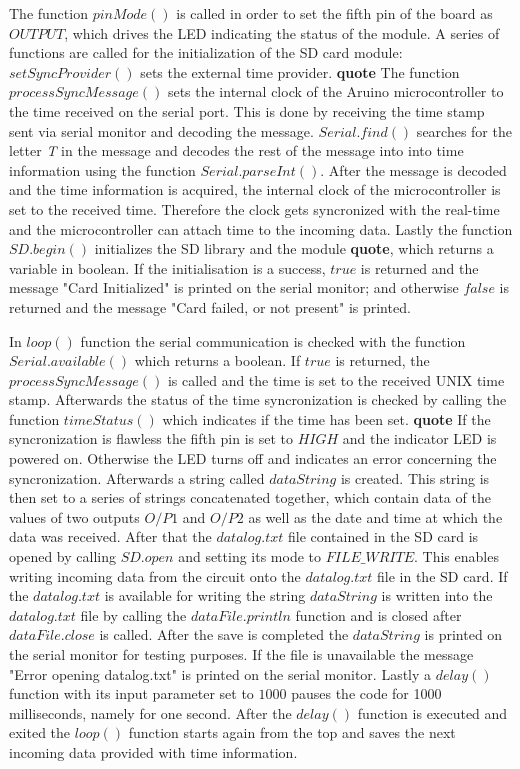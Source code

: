 The function $pinMode()$ is called in order to set the fifth pin of the board as $OUTPUT$, which drives the LED indicating the status of the module. A series of functions are called for the initialization of the SD card module: $setSyncProvider()$ sets the external time provider. \textbf{quote} The function $processSyncMessage()$ sets the internal clock of the Aruino microcontroller to the time received on the serial port. This is done by receiving the time stamp sent via serial monitor and decoding the message. $Serial.find()$ searches for the letter \textit{T} in the message and decodes the rest of the message into  into time information using the function $Serial.parseInt()$. After the message is decoded and the time information is acquired, the internal clock of the microcontroller is set to the received time. Therefore the clock gets syncronized with the real-time and the microcontroller can attach time to the incoming data. Lastly the function $SD.begin()$ initializes the SD library and the module \textbf{quote}, which returns a variable in boolean. If the initialisation is a success, $true$ is returned and the message "Card Initialized" is printed on the serial monitor; and otherwise $false$ is returned and the message "Card failed, or not present" is printed. \par 
In $loop()$ function the serial communication is checked with the function $Serial.available()$ which returns a boolean. If $true$ is returned, the $processSyncMessage()$ is called and the time is set to the received UNIX time stamp. Afterwards the status of the time syncronization is checked by calling the function $timeStatus()$ which indicates if the time has been set. \textbf{quote} If the syncronization is flawless the fifth pin is set to $HIGH$ and the indicator LED is powered on. Otherwise the LED turns off and indicates an error concerning the syncronization. Afterwards a string called $dataString$ is created. This string is then set to a series of strings concatenated together, which contain data of the values of two outputs $O/P1$ and $O/P2$ as well as the date and time at which the data was received. After that the $datalog.txt$ file contained in the SD card is opened by calling $SD.open$ and setting its mode to $FILE\_WRITE$. This enables writing incoming data from the circuit onto the $datalog.txt$ file in the SD card. If the $datalog.txt$ is available for writing the string $dataString$ is written into the $datalog.txt$ file by calling the $dataFile.println$ function and is closed after $dataFile.close$ is called. After the save is completed the $dataString$ is printed on the serial monitor for testing purposes. If the file is unavailable the message "Error opening datalog.txt" is printed on the serial monitor. Lastly a $delay()$ function with its input parameter set to $1000$ pauses the code for 1000 milliseconds, namely for one second. After the $delay()$ function is executed and exited the $loop()$ function starts again from the top and saves the next incoming data provided with time information.         


